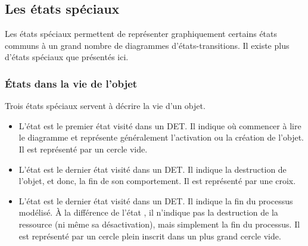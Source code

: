\subsection{Les états spéciaux}
\label{subsec:etats_speciaux}

Les états spéciaux permettent de représenter graphiquement certains états communs à un grand nombre de diagrammes d'états-transitions. Il existe plus d'états spéciaux que présentés ici.

\subsubsection{États dans la vie de l'objet}

Trois états spéciaux servent à décrire la vie d'un objet. 

\begin{itemize}
	\item L'état  est le premier état visité dans un \acrshort{DET}. Il indique où commencer à lire le diagramme et représente généralement l'activation ou la création de l'objet. Il est représenté par un cercle vide. 
	\item L'état  est le dernier état visité dans un \acrshort{DET}. Il indique la destruction de l'objet, et donc, la fin de son comportement. Il est représenté par une croix. 
	\item L'état  est le dernier état visité dans un \acrshort{DET}. Il indique la fin du processus modélisé. À la différence de l'état , il n'indique pas la destruction de la ressource (ni même sa désactivation), mais simplement la fin du processus. Il est représenté par un cercle plein inscrit dans un plus grand cercle vide. 
\end{itemize}

